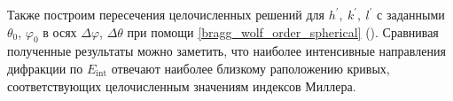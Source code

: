 Также построим пересечения целочисленных решений для $h^\prime,\:k^\prime,\:l^\prime$ с заданными $\theta_0$, $\varphi_0$ в осях $\Delta \varphi$, $\Delta \theta$ при помощи \autoref{bragg_wolf_order_spherical} (). Сравнивая полученные результаты можно заметить, что наиболее интенсивные направления дифракции по $E_{\textrm{int}}$ отвечают наиболее близкому раположению кривых, соответствующих целочисленным значениям индексов Миллера. 



